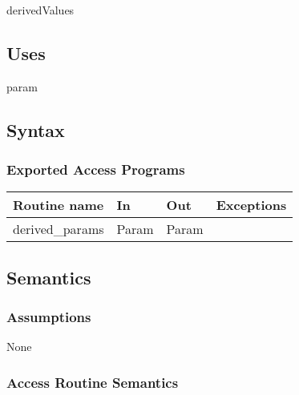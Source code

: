 \documentclass[12pt,fleqn]{article}
\begin{document}
derivedValues

\subsection* {Uses}

param

\subsection* {Syntax}

\subsubsection* {Exported Access Programs}

\begin{tabular}{| l | l | l | l |}
\hline
\textbf{Routine name} & \textbf{In} & \textbf{Out} & \textbf{Exceptions}\\
\hline
derived\_params & Param & Param & ~\\
\hline

\end{tabular}

\subsection* {Semantics}

\subsubsection* {Assumptions}
None

\subsubsection* {Access Routine Semantics}
\end{document}
